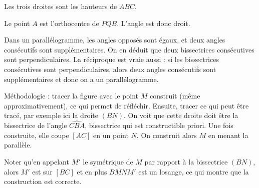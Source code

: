 \begin{Soln}{42}
Les trois droites sont les hauteurs de $ABC$.

\end{Soln}
\begin{Soln}{43}
  Le point $A$ est l'orthocentre de $PQB$. L'angle est donc droit.
\end{Soln}
\begin{Soln}{44}
Dans un parallélogramme, les angles opposés sont égaux, et deux angles consécutifs sont supplémentaires. On en déduit que deux bissectrices consécutives sont perpendiculaires. La réciproque est vraie aussi : si les bissectrices consécutives sont perpendiculaires, alors deux angles consécutifs sont supplémentaires et donc on a un parallélogramme.
\end{Soln}
\begin{Soln}{45}
Méthodologie : tracer la figure avec le point $M$ construit (même approximativement), ce qui permet de réfléchir. Ensuite, tracer ce qui peut être tracé, par exemple ici la droite $(BN)$. On voit que cette droite doit être la bissectrice de l'angle $\widehat{CBA}$, bissectrice qui est constructible  priori. Une fois construite, elle coupe $[AC]$ en un point $N$. On construit alors $M$ en menant la parallèle.

Noter qu'en appelant $M'$ le symétrique de $M$ par rapport à la bissectrice $(BN)$, alors $M'$ est sur $[BC]$ et en plus $BMNM'$ est un losange, ce qui montre que la construction est correcte.
\end{Soln}
